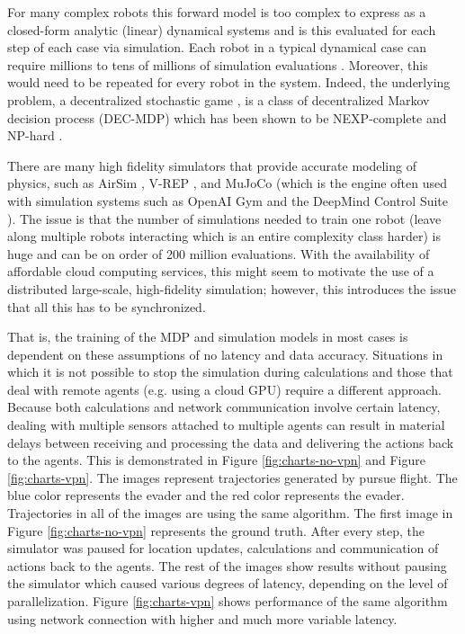\documentclass{article}
\let\cite\citep
\begin{document}
For many complex robots this forward model is too complex to express as a closed-form analytic (linear) dynamical systems and is this evaluated for each step of each case via simulation.  Each robot in a typical dynamical case can require millions to tens of millions of simulation evaluations \cite{SAC}.   Moreover, this would need to be repeated for every robot in the system.   Indeed, the underlying problem, a decentralized stochastic game \cite{redulla2018simulating}, is a class of decentralized Markov decision process (DEC-MDP) which has been shown to be NEXP-complete and NP-hard \cite{papadimitriou1986intractable, bernstein2002complexity}.

There are many high fidelity simulators that provide accurate modeling of physics, such as AirSim \cite{shah2018airsim}, V-REP \cite{rohmer2013v}, and MuJoCo \cite{Todorov2012MuJoCo} (which is the engine often used with simulation systems such as OpenAI Gym \cite{Brockman2016Gym} and the DeepMind Control Suite \cite{Tassa2018DMC}).  The issue is that the number of simulations needed to train one robot (leave along multiple robots interacting which is an entire complexity class harder) is huge and can be on order of 200 million evaluations.  With the availability of affordable cloud computing services, this might seem to motivate the use of a distributed large-scale, high-fidelity simulation; however, this introduces the issue that all this has to be synchronized.

That is, the training of the MDP and simulation models in most cases is dependent on these assumptions of no latency and data accuracy. Situations in which it is not possible to stop the simulation during calculations and those that deal with remote agents (e.g. using a cloud GPU) require a different approach. Because both calculations and network communication involve certain latency, dealing with multiple sensors attached to multiple agents can result in material delays between receiving and processing the data and delivering the actions back to the agents. This is demonstrated in Figure \ref{fig:charts-no-vpn} and Figure \ref{fig:charts-vpn}. The images represent trajectories generated by pursue flight. The blue color represents the evader and the red color represents the evader. Trajectories in all of the images are using the same algorithm. The first image in Figure \ref{fig:charts-no-vpn} represents the ground truth. After every step, the simulator was paused for location updates, calculations and communication of actions back to the agents. The rest of the images show results without pausing the simulator which caused various degrees of latency, depending on the level of parallelization. Figure \ref{fig:charts-vpn} shows performance of the same algorithm using network connection with higher and much more variable latency.
\end{document}
